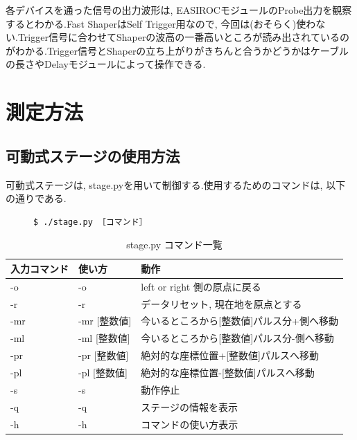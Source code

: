 各デバイスを通った信号の出力波形は, EASIROCモジュールのProbe出力を観察するとわかる.Fast ShaperはSelf Trigger用なので, 今回は(おそらく)使わない.Trigger信号に合わせてShaperの波高の一番高いところが読み出されているのがわかる.Trigger信号とShaperの立ち上がりがきちんと合うかどうかはケーブルの長さやDelayモジュールによって操作できる.

\section{測定方法}

\subsection{可動式ステージの使用方法}

可動式ステージは, stage.pyを用いて制御する.使用するためのコマンドは, 以下の通りである.
\begin{figure}[H]
  \begin{lstlisting}[caption=stage.pyのコマンド]
$ ./stage.py ［コマンド］  
  \end{lstlisting}
\end{figure}


\begin{table}[H]
  \begin{center}
    \caption{stage.py コマンド一覧}
    \begin{tabular}{|l|l|l|} \hline
      入力コマンド & 使い方       & 動作                                      \\ \hline \hline
      -o           & -o           & left or right 側の原点に戻る              \\ \hline
      -r           & -r           & データリセット, 現在地を原点とする        \\ \hline
      -mr          & -mr [整数値] & 今いるところから[整数値]パルス分+側へ移動 \\ \hline
      -ml          & -ml [整数値] & 今いるところから[整数値]パルス分-側へ移動 \\ \hline
      -pr          & -pr [整数値] & 絶対的な座標位置+[整数値]パルスへ移動     \\ \hline
      -pl          & -pl [整数値] & 絶対的な座標位置-[整数値]パルスへ移動     \\ \hline
      -s           & -s           & 動作停止                                  \\ \hline
      -q           & -q           & ステージの情報を表示                      \\ \hline
      -h           & -h           & コマンドの使い方表示                      \\ \hline
    \end{tabular}
  \end{center}
\end{table}

